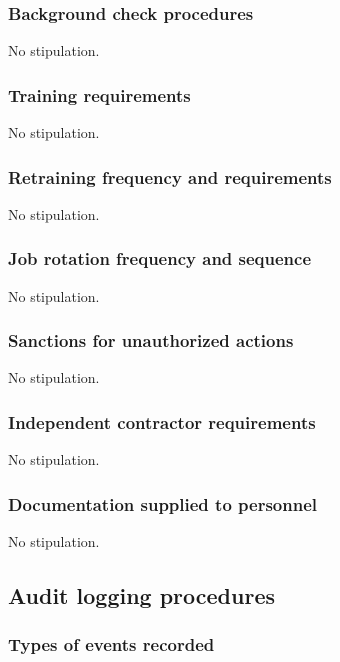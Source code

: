 \documentclass[10pt]{article}
\begin{document}
\subsubsection{Background check procedures}

No stipulation.

\subsubsection{Training requirements}

No stipulation.

\subsubsection{Retraining frequency and requirements}

No stipulation.

\subsubsection{Job rotation frequency and sequence}

No stipulation.

\subsubsection{Sanctions for unauthorized actions}

No stipulation.

\subsubsection{Independent contractor requirements}

No stipulation.

\subsubsection{Documentation supplied to personnel}

No stipulation.

\subsection{Audit logging procedures}

\subsubsection{Types of events recorded}
\end{document}
